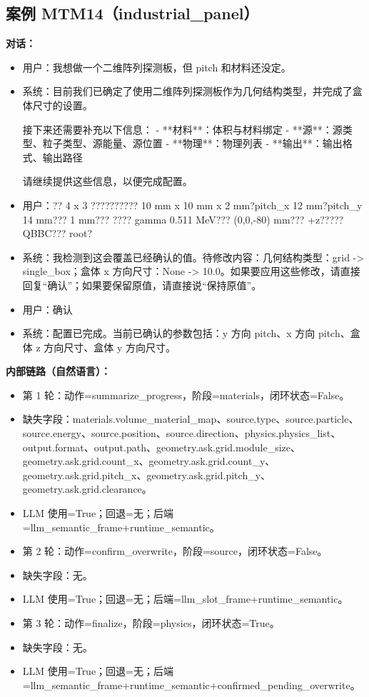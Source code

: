 \documentclass[11pt]{ctexart}
\begin{document}
\subsection{案例 MTM14（industrial\_panel）}
\textbf{对话：}
\begin{itemize}
\item 用户：我想做一个二维阵列探测板，但 pitch 和材料还没定。
\item 系统：目前我们已确定了使用二维阵列探测板作为几何结构类型，并完成了盒体尺寸的设置。

接下来还需要补充以下信息：
- **材料**：体积与材料绑定
- **源**：源类型、粒子类型、源能量、源位置
- **物理**：物理列表
- **输出**：输出格式、输出路径

请继续提供这些信息，以便完成配置。
\item 用户：?? 4 x 3 ?????????? 10 mm x 10 mm x 2 mm?pitch\_x 12 mm?pitch\_y 14 mm??? 1 mm??? ???? gamma 0.511 MeV??? (0,0,-80) mm??? +z????? QBBC??? root?
\item 系统：我检测到这会覆盖已经确认的值。待修改内容：几何结构类型：grid -> single\_box；盒体 x 方向尺寸：None -> 10.0。如果要应用这些修改，请直接回复“确认”；如果要保留原值，请直接说“保持原值”。
\item 用户：确认
\item 系统：配置已完成。当前已确认的参数包括：y 方向 pitch、x 方向 pitch、盒体 z 方向尺寸、盒体 y 方向尺寸。
\end{itemize}
\textbf{内部链路（自然语言）：}
\begin{itemize}
\item 第 1 轮：动作=summarize\_progress，阶段=materials，闭环状态=False。
\item 缺失字段：materials.volume\_material\_map、source.type、source.particle、source.energy、source.position、source.direction、physics.physics\_list、output.format、output.path、geometry.ask.grid.module\_size、geometry.ask.grid.count\_x、geometry.ask.grid.count\_y、geometry.ask.grid.pitch\_x、geometry.ask.grid.pitch\_y、geometry.ask.grid.clearance。
\item LLM 使用=True；回退=无；后端=llm\_semantic\_frame+runtime\_semantic。
\item 第 2 轮：动作=confirm\_overwrite，阶段=source，闭环状态=False。
\item 缺失字段：无。
\item LLM 使用=True；回退=无；后端=llm\_slot\_frame+runtime\_semantic。
\item 第 3 轮：动作=finalize，阶段=physics，闭环状态=True。
\item 缺失字段：无。
\item LLM 使用=True；回退=无；后端=llm\_semantic\_frame+runtime\_semantic+confirmed\_pending\_overwrite。
\end{itemize}
\end{document}
